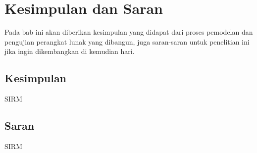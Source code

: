 \chapter{Kesimpulan dan Saran}
\label{chap:kesimpulandansaran}

Pada bab ini akan diberikan kesimpulan yang didapat dari proses pemodelan dan
pengujian perangkat lunak yang dibangun, juga saran-saran untuk penelitian ini
jika ingin dikembangkan di kemudian hari.

\section{Kesimpulan}
\label{sec:kesimpulan}
SIRM

\section{Saran}
\label{sec:saran}
SIRM
